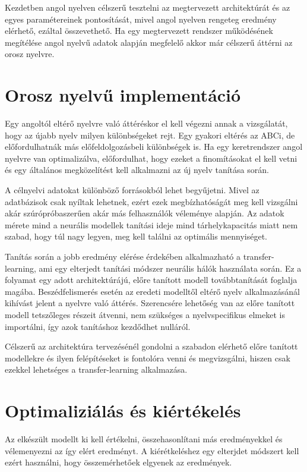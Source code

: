 Kezdetben angol nyelven célszerű tesztelni az megtervezett architektúrát és az egyes paramétereinek pontosítását, mivel angol nyelven rengeteg eredmény elérhető, ezáltal összevethető. Ha egy megtervezett rendszer működésének megítélése angol nyelvű adatok alapján megfelelő akkor már célszerű áttérni az orosz nyelvre. 

\section{Orosz nyelvű implementáció}

Egy angoltól eltérő nyelvre való áttéréskor el kell végezni annak a vizsgálatát, hogy az újabb nyelv milyen különbségeket rejt. Egy gyakori eltérés az ABCi, de előfordulhatnák más előfeldolgozásbeli   különbségek is. Ha egy keretrendszer angol nyelvre van optimalizálva, előfordulhat, hogy ezeket a finomításokat el kell vetni és egy általános megközelítést kell alkalmazni az új nyelv tanítása során.

A célnyelvi adatokat különböző forrásokból lehet begyűjetni. Mivel az adatbázisok csak nyíltak lehetnek, ezért ezek megbízhatóságát meg kell vizsgálni akár szúrópróbaszerűen akár más felhasználók véleménye alapján. Az adatok mérete mind a neurális modellek tanítási ideje mind tárhelykapacitás miatt nem szabad, hogy túl nagy legyen, meg kell találni az optimális mennyiséget.

Tanítás során a jobb eredmény elérése érdekében alkalmazható a transfer-learning, ami egy elterjedt tanítási módszer neurális hálók használata során. Ez a folyamat egy adott architektúrájú, előre tanított modell továbbtanítását foglalja magába. Beszédfelismerés esetén az eredeti modelltől eltérő nyelv alkalmazásánál kihívást jelent a nyelvre való áttérés. Szerencsére lehetőség van az előre tanított modell tetszőleges részeit átvenni, nem szükséges a nyelvspecifikus elmeket is importálni, így azok tanításhoz kezdődhet nulláról.

Célszerű az architektúra tervezésénél gondolni a szabadon elérhető előre tanított modellekre és ilyen felépítéseket is fontolóra venni és megvizsgálni, hiszen csak ezekkel lehetséges a transfer-learning alkalmazása.

\section{Optimaliziálás és kiértékelés}

Az elkészült modellt ki kell értékelni, összehasonlítani más eredményekkel és vélemenyezni az így elért eredményt. A kiérétkeléshez egy elterjdet módszert kell ezért használni, hogy összemérhetőek elgyenek az eredmények.

